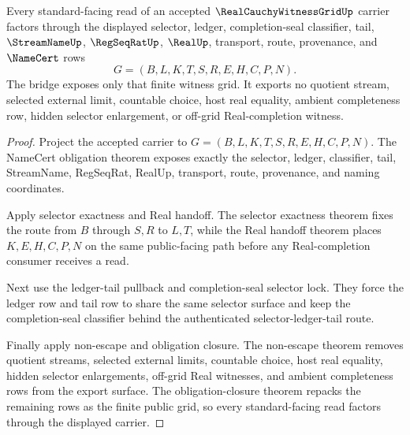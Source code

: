\begin{theorem}
\label{thm:real-cauchy-witness-grid-standard-bridge}
Every standard-facing read of an accepted $\RealCauchyWitnessGridUp$ carrier factors through the displayed selector, ledger, completion-seal classifier, tail, $\StreamNameUp$, $\RegSeqRatUp$, $\RealUp$, transport, route, provenance, and $\NameCert$ rows
$$
G=(B,L,K,T,S,R,E,H,C,P,N).
$$
The bridge exposes only that finite witness grid. It exports no quotient stream, selected external limit, countable choice, host real equality, ambient completeness row, hidden selector enlargement, or off-grid Real-completion witness.
\end{theorem}
\begin{proof}
Project the accepted carrier to $G=(B,L,K,T,S,R,E,H,C,P,N)$. The NameCert obligation theorem exposes exactly the selector, ledger, classifier, tail, StreamName, RegSeqRat, RealUp, transport, route, provenance, and naming coordinates.

Apply selector exactness and Real handoff. The selector exactness theorem fixes the route from $B$ through $S,R$ to $L,T$, while the Real handoff theorem places $K,E,H,C,P,N$ on the same public-facing path before any Real-completion consumer receives a read.

Next use the ledger-tail pullback and completion-seal selector lock. They force the ledger row and tail row to share the same selector surface and keep the completion-seal classifier behind the authenticated selector-ledger-tail route.

Finally apply non-escape and obligation closure. The non-escape theorem removes quotient streams, selected external limits, countable choice, host real equality, hidden selector enlargements, off-grid Real witnesses, and ambient completeness rows from the export surface. The obligation-closure theorem repacks the remaining rows as the finite public grid, so every standard-facing read factors through the displayed carrier.
\end{proof}



